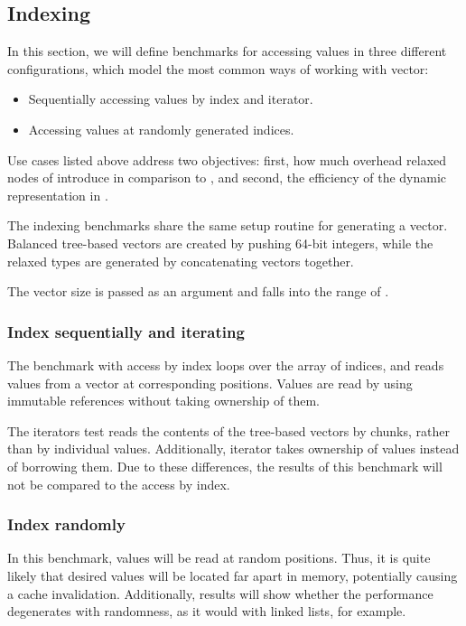 \subsection{Indexing}
In this section, we will define benchmarks for accessing values in three different configurations, which model the most common ways of working with vector:

\begin{itemize}
    \item Sequentially accessing values by index and iterator.
    \item Accessing values at randomly generated indices.
\end{itemize}

Use cases listed above address two objectives: first, how much overhead relaxed nodes of \rrbtree{} introduce in comparison to \rbtree{}, and second, the efficiency of the dynamic representation in \pvec{}.

The indexing benchmarks share the same setup routine for generating a vector. Balanced tree-based vectors are created by pushing 64-bit integers, while the relaxed types are generated by concatenating vectors together.

The vector size is passed as an argument and falls into the range of \range{[20, \mega{1}]}.

\subsubsection*{Index sequentially and iterating}
The benchmark with access by index loops over the array of \range{[0, N)} indices, and reads values from a vector at corresponding positions. Values are read by using immutable references without taking ownership of them.

The iterators test reads the contents of the tree-based vectors by chunks, rather than by individual values. Additionally, iterator takes ownership of values instead of borrowing them. Due to these differences, the results of this benchmark will not be compared to the access by index.

\subsubsection*{Index randomly}
In this benchmark, values will be read at random positions. Thus, it is quite likely that desired values will be located far apart in memory, potentially causing a cache invalidation. Additionally, results will show whether the performance degenerates with randomness, as it would with linked lists, for example.

